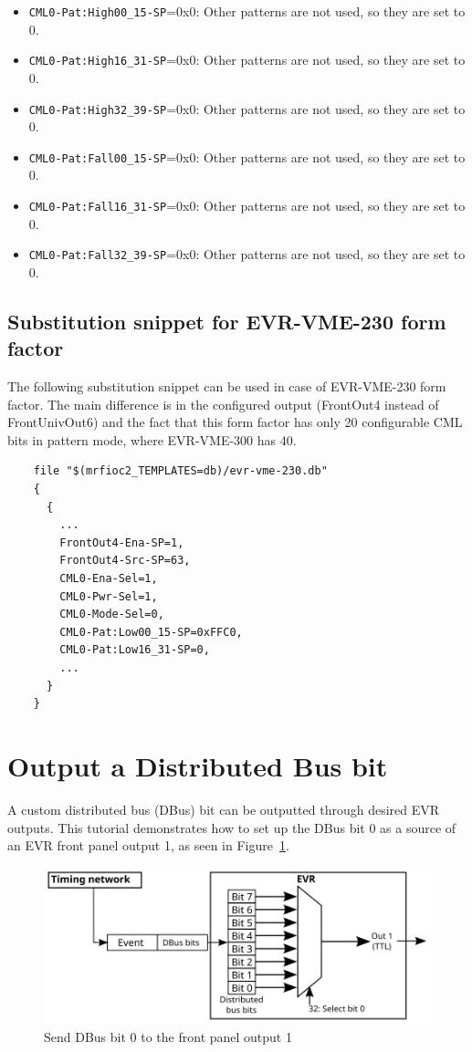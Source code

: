 \documentclass[12pt,a4paper]{article}
\begin{document}
\begin{itemize}
	\item \texttt{CML0-Pat:High00\_15-SP}=0x0: Other patterns are not used, so they are set to 0.
	\item \texttt{CML0-Pat:High16\_31-SP}=0x0: Other patterns are not used, so they are set to 0.
	\item \texttt{CML0-Pat:High32\_39-SP}=0x0: Other patterns are not used, so they are set to 0.
	\item \texttt{CML0-Pat:Fall00\_15-SP}=0x0: Other patterns are not used, so they are set to 0.
	\item \texttt{CML0-Pat:Fall16\_31-SP}=0x0: Other patterns are not used, so they are set to 0.
	\item \texttt{CML0-Pat:Fall32\_39-SP}=0x0: Other patterns are not used, so they are set to 0.
\end{itemize}

\subsection{Substitution snippet for EVR-VME-230 form factor}
The following substitution snippet can be used in case of EVR-VME-230 form factor. The main difference is in the configured output (FrontOut4 instead of FrontUnivOut6) and the fact that this form factor has only 20 configurable CML bits in pattern mode, where EVR-VME-300 has 40.
\begin{verbatim}
	file "$(mrfioc2_TEMPLATES=db)/evr-vme-230.db"
	{
	  {
	    ...
	    FrontOut4-Ena-SP=1,
	    FrontOut4-Src-SP=63,
	    CML0-Ena-Sel=1,
	    CML0-Pwr-Sel=1,
	    CML0-Mode-Sel=0,
	    CML0-Pat:Low00_15-SP=0xFFC0,
	    CML0-Pat:Low16_31-SP=0, 
	    ...
	  }
	}
\end{verbatim}

\section{Output a Distributed Bus bit}
A custom distributed bus (DBus) bit can be outputted through desired EVR outputs. This tutorial demonstrates how to set up the DBus bit 0 as a source of an EVR front panel output 1, as seen in Figure~\ref{fig:dbus}. 

\begin{figure}[H]
	\centering
	\includegraphics[]{./img/dbus}
	\caption{Send DBus bit 0 to the front panel output 1}
	\label{fig:dbus}
\end{figure}
\end{document}
